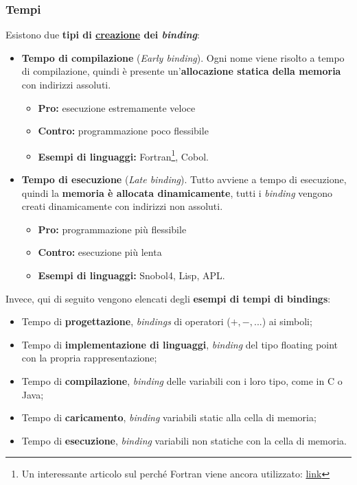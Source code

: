 \documentclass[a4paper]{article}
\begin{document}
	\subsubsection{Tempi}
	
	Esistono due \textbf{tipi di \underline{creazione} dei \emph{binding}}:
	\begin{itemize}
		\item \textcolor{Red3}{\textbf{Tempo di compilazione}} (\emph{Early binding}). Ogni nome viene risolto a tempo di compilazione, quindi è presente un'\textbf{allocazione statica della memoria} con indirizzi assoluti.
		\begin{itemize}
			\item \textcolor{Green4}{\textbf{Pro:}} esecuzione estremamente veloce
			
			\item \textcolor{Red3}{\textbf{Contro:}} programmazione poco flessibile
			
			\item \textbf{Esempi di linguaggi:}  Fortran\footnote{Un interessante articolo sul perché Fortran viene ancora utilizzato: \href{https://www.matecdev.com/posts/why-fortran-still-used.html}{link}}, Cobol.
		\end{itemize}
		
		\item \textcolor{Red3}{\textbf{Tempo di esecuzione}} (\emph{Late binding}). Tutto avviene a tempo di esecuzione, quindi la \textbf{memoria è allocata dinamicamente}, tutti i \emph{binding} vengono creati dinamicamente con indirizzi non assoluti.
		\begin{itemize}
			\item \textcolor{Green4}{\textbf{Pro:}} programmazione più flessibile
			
			\item \textcolor{Red3}{\textbf{Contro:}} esecuzione più lenta
			
			\item \textbf{Esempi di linguaggi:} Snobol4, Lisp, APL.
		\end{itemize}
	\end{itemize}
	Invece, qui di seguito vengono elencati degli \textbf{esempi di tempi di bindings}:
	\begin{itemize}
		\item Tempo di \textbf{progettazione}, \emph{bindings} di operatori ($+,-,...$) ai simboli;
		
		\item Tempo di \textbf{implementazione di linguaggi}, \emph{binding} del tipo floating point con la propria rappresentazione;
		
		\item Tempo di \textbf{compilazione}, \emph{binding} delle variabili con i loro tipo, come in C o Java;
		
		\item Tempo di \textbf{caricamento}, \emph{binding} variabili \textsf{static} alla cella di memoria;
		
		\item Tempo di \textbf{esecuzione}, \emph{binding} variabili non statiche con la cella di memoria.
	\end{itemize}
\end{document}
